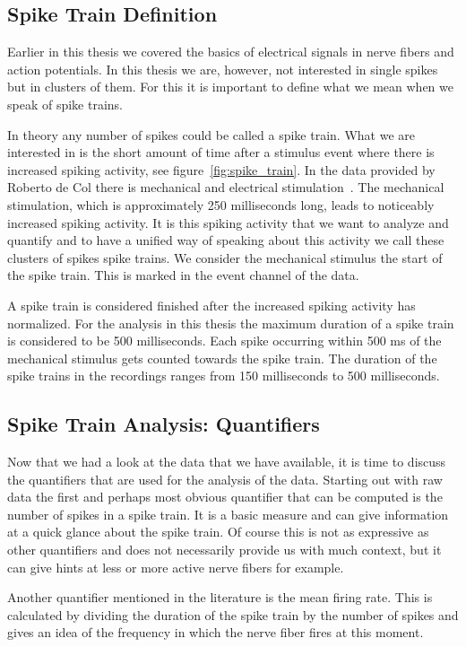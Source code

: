 \subsection{Spike Train Definition}
Earlier in this thesis we covered the basics of electrical signals in nerve fibers and action potentials. In this thesis we are, however, not interested in single spikes but in clusters of them. For this it is important to define what we mean when we speak of spike trains.

In theory any number of spikes could be called a spike train. What we are interested in is the short amount of time after a stimulus event where there is increased spiking activity, see figure~\ref{fig:spike_train}. In the data provided by Roberto de Col there is mechanical and electrical stimulation~\cite{roberto}. The mechanical stimulation, which is approximately 250 milliseconds long, leads to noticeably increased spiking activity. It is this spiking activity that we want to analyze and quantify and to have a unified way of speaking about this activity we call these clusters of spikes spike trains. We consider the mechanical stimulus the start of the spike train. This is marked in the event channel of the data. 

A spike train is considered finished after the increased spiking activity has normalized. For the analysis in this thesis the maximum duration of a spike train is considered to be 500 milliseconds. Each spike occurring within 500 ms of the mechanical stimulus gets counted towards the spike train. The duration of the spike trains in the recordings ranges from 150 milliseconds to 500 milliseconds.

\subsection{Spike Train Analysis: Quantifiers}
Now that we had a look at the data that we have available, it is time to discuss the quantifiers that are used for the analysis of the data.
Starting out with raw data the first and perhaps most obvious quantifier that can be computed is the number of spikes in a spike train. It is a basic measure and can give information at a quick glance about the spike train. Of course this is not as expressive as other quantifiers and does not necessarily provide us with much context, but it can give hints at less or more active nerve fibers for example. 

Another quantifier mentioned in the literature is the mean firing rate. This is calculated by dividing the duration of the spike train by the number of spikes and gives an idea of the frequency in which the nerve fiber fires at this moment.

